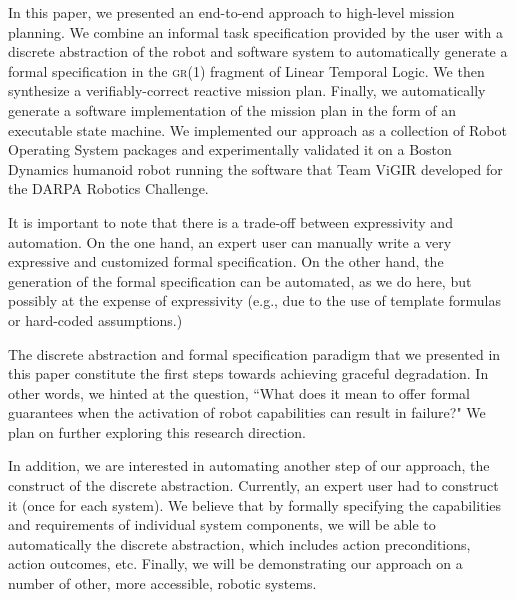 
In this paper, we presented an end-to-end approach to high-level mission planning.
We combine an informal task specification provided by the user with a discrete abstraction of the robot and software system to automatically generate a formal specification in the \textsc{gr(1)} fragment of Linear Temporal Logic.
We then synthesize a verifiably-correct reactive mission plan.
Finally, we automatically generate a software implementation of the mission plan in the form of an executable state machine.
We implemented our approach as a collection of Robot Operating System packages and experimentally validated it on a Boston Dynamics humanoid robot running the software that Team ViGIR developed for the DARPA Robotics Challenge.

It is important to note that there is a trade-off between expressivity and automation.
On the one hand, an expert user can manually write a very expressive and customized formal specification.
On the other hand, the generation of the formal specification can be automated, as we do here, but possibly at the expense of expressivity (e.g., due to the use of template formulas or hard-coded assumptions.)

The discrete abstraction and formal specification paradigm that we presented in this paper constitute the first steps towards achieving graceful degradation.
In other words, we hinted at the question, ``What does it mean to offer formal guarantees when the activation of robot capabilities can result in failure?"
We plan on further exploring this research direction.

In addition, we are interested in automating another step of our approach, the construct of the discrete abstraction.
Currently, an expert user had to construct it (once for each system).
We believe that by formally specifying the capabilities and requirements of individual system components, we will be able to automatically the discrete abstraction, which includes action preconditions, action outcomes, etc.
Finally, we will be demonstrating our approach on a number of other, more accessible, robotic systems.



